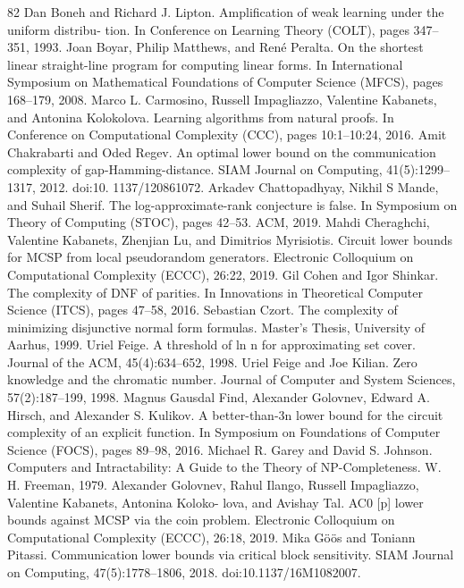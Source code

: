 \documentclass[10pt,a4paper]{article}
\begin{document}
\begin{thebibliography}{82}
Dan Boneh and Richard J. Lipton. Amplification of weak learning under the uniform distribu- tion. In Conference on Learning Theory (COLT), pages 347–351, 1993.
Joan Boyar, Philip Matthews, and René Peralta. On the shortest linear straight-line program for computing linear forms. In International Symposium on Mathematical Foundations of Computer Science (MFCS), pages 168–179, 2008.
Marco L. Carmosino, Russell Impagliazzo, Valentine Kabanets, and Antonina Kolokolova. Learning algorithms from natural proofs. In Conference on Computational Complexity (CCC), pages 10:1–10:24, 2016.
Amit Chakrabarti and Oded Regev. An optimal lower bound on the communication complexity of gap-Hamming-distance. SIAM Journal on Computing, 41(5):1299–1317, 2012. doi:10. 1137/120861072.
Arkadev Chattopadhyay, Nikhil S Mande, and Suhail Sherif. The log-approximate-rank conjecture is false. In Symposium on Theory of Computing (STOC), pages 42–53. ACM, 2019.
Mahdi Cheraghchi, Valentine Kabanets, Zhenjian Lu, and Dimitrios Myrisiotis. Circuit lower bounds for MCSP from local pseudorandom generators. Electronic Colloquium on Computational Complexity (ECCC), 26:22, 2019.
Gil Cohen and Igor Shinkar. The complexity of DNF of parities. In Innovations in Theoretical Computer Science (ITCS), pages 47–58, 2016.
Sebastian Czort. The complexity of minimizing disjunctive normal form formulas. Master’s Thesis, University of Aarhus, 1999.
Uriel Feige. A threshold of ln n for approximating set cover. Journal of the ACM, 45(4):634–652, 1998.
Uriel Feige and Joe Kilian. Zero knowledge and the chromatic number. Journal of Computer and System Sciences, 57(2):187–199, 1998.
Magnus Gausdal Find, Alexander Golovnev, Edward A. Hirsch, and Alexander S. Kulikov. A better-than-3n lower bound for the circuit complexity of an explicit function. In Symposium on Foundations of Computer Science (FOCS), pages 89–98, 2016.
Michael R. Garey and David S. Johnson. Computers and Intractability: A Guide to the Theory of NP-Completeness. W. H. Freeman, 1979.
Alexander Golovnev, Rahul Ilango, Russell Impagliazzo, Valentine Kabanets, Antonina Koloko- lova, and Avishay Tal. AC0 [p] lower bounds against MCSP via the coin problem. Electronic Colloquium on Computational Complexity (ECCC), 26:18, 2019.
Mika Göös and Toniann Pitassi. Communication lower bounds via critical block sensitivity. SIAM Journal on Computing, 47(5):1778–1806, 2018. doi:10.1137/16M1082007.

\end{thebibliography}
\end{document}
